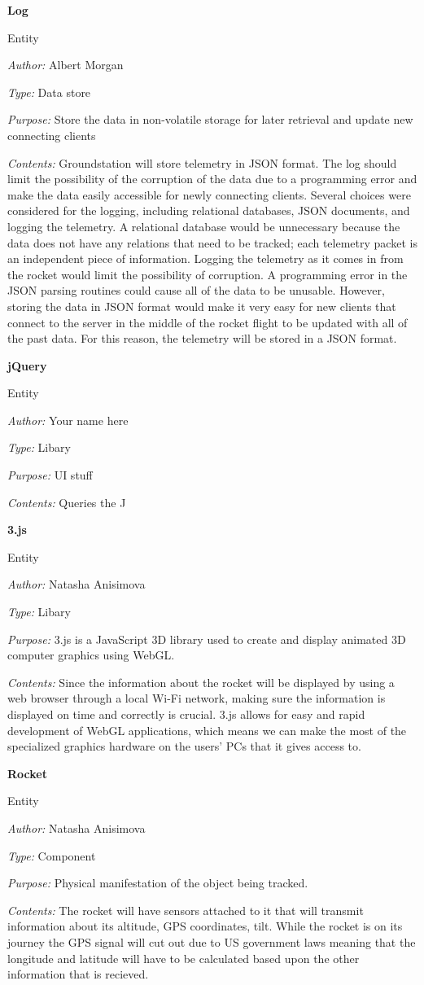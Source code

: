 \documentclass[10pt,draftclsnofoot,onecolumn]{IEEEtran}
\newcommand{\newentity}[5]{
	\begin{minipage}{\linewidth}
	\noindent\textbf{#2}
	
	\noindent Entity
	
	\noindent\textit{Author:} {#1}
		
	\noindent\textit{Type:} {#3}
	
	\noindent\textit{Purpose:} {#4}
	
	\noindent\textit{Contents:} {#5}
	\vspace{.5cm}
	\end{minipage}
}
\begin{document}
	\newentity
	{Albert Morgan}
	{Log}
	{Data store}
	{Store the data in non-volatile storage for later retrieval and update new connecting clients}
	{
		Groundstation will store telemetry in JSON format.
		The log should limit the possibility of the corruption of the data due to a programming error
		and make the data easily accessible for newly connecting clients.
		Several choices were considered for the logging, including relational databases, JSON documents, and logging the telemetry.
		A relational database would be unnecessary because the data does not have any relations that need to be tracked;
		each telemetry packet is an independent piece of information.
		Logging the telemetry as it comes in from the rocket would limit the possibility of corruption.
		A programming error in the JSON parsing routines could cause all of the data to be unusable.
		However, storing the data in JSON format would make it very easy for new clients that connect to the server in the middle of the rocket flight to be updated with all of the past data.
		For this reason, the telemetry will be stored in a JSON format.
	}
	
	
	\newentity
	{Your name here}
	{jQuery}
	{Libary}
	{UI stuff}
	{Queries the J}
	
	\newentity
	{Natasha Anisimova}
	{3.js}
	{Libary}
	{3.js is a JavaScript 3D library used to create and display animated 3D computer graphics using WebGL.}
	{	Since the information about the rocket will be displayed by using a web browser through a local Wi-Fi network, 
		making sure the information is displayed on time and correctly is crucial. 3.js allows for easy and rapid development
		of WebGL applications, which means we can make the most of the specialized graphics hardware on the users'
		PCs that it gives access to.
	}

	\newentity
	{Natasha Anisimova}
	{Rocket}
	{Component}
	{Physical manifestation of the object being tracked.}
	{
		The rocket will have sensors attached to it that will transmit information about its altitude, GPS coordinates, tilt.
		While the rocket is on its journey the GPS signal will cut out due to US government laws meaning that the longitude
		and latitude will have to be calculated based upon the other information that is recieved. 
	}
	
\end{document}
